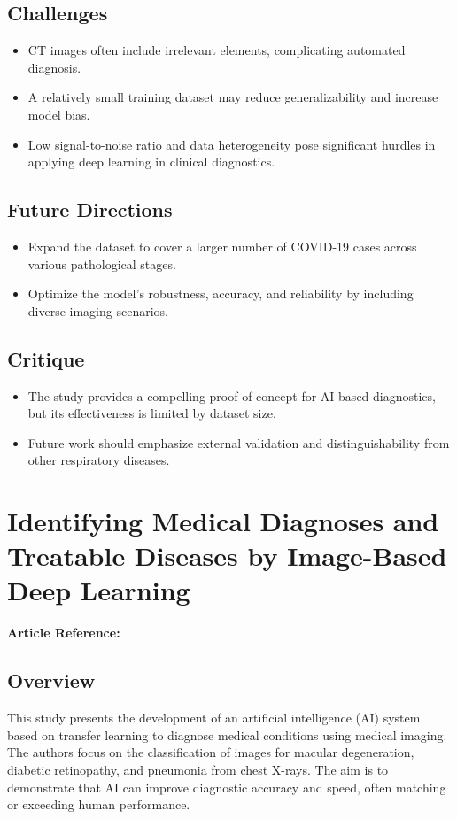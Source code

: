 \subsection*{Challenges}
\begin{itemize}
    \item CT images often include irrelevant elements, complicating automated diagnosis.
    \item A relatively small training dataset may reduce generalizability and increase model bias.
    \item Low signal-to-noise ratio and data heterogeneity pose significant hurdles in applying deep learning in clinical diagnostics.
\end{itemize}

\subsection*{Future Directions}
\begin{itemize}
    \item Expand the dataset to cover a larger number of COVID-19 cases across various pathological stages.
    \item Optimize the model's robustness, accuracy, and reliability by including diverse imaging scenarios.
\end{itemize}

\subsection*{Critique}
\begin{itemize}
    \item The study provides a compelling proof-of-concept for AI-based diagnostics, but its effectiveness is limited by dataset size.
    \item Future work should emphasize external validation and distinguishability from other respiratory diseases.
\end{itemize}



\section{Identifying Medical Diagnoses and Treatable Diseases by Image-Based Deep Learning}
\textbf{Article Reference:} \cite{kermanyIdentifyingMedicalDiagnoses2018}

\subsection*{Overview}
This study presents the development of an artificial intelligence (AI) system based on transfer learning to diagnose medical conditions using medical imaging. The authors focus on the classification of images for macular degeneration, diabetic retinopathy, and pneumonia from chest X-rays. The aim is to demonstrate that AI can improve diagnostic accuracy and speed, often matching or exceeding human performance.

